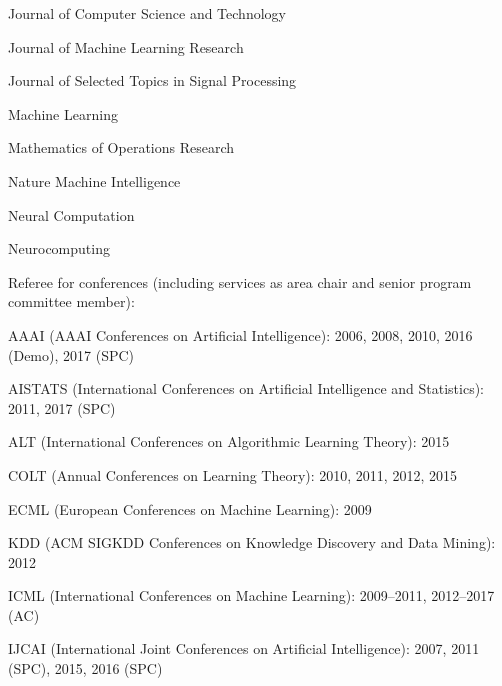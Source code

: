 \documentclass[10pt,twoside,letterpaper]{article}
\newcommand{\negitemspace}{\vspace{1mm}}
\begin{document}
\begin{compactitem}
\begin{compactitem}
\item{Journal of Computer Science and Technology}

\item{Journal of Machine Learning Research}

\item{Journal of Selected Topics in Signal Processing}

\item{Machine Learning}

\item{Mathematics of Operations Research}

\item{Nature Machine Intelligence}

\item{Neural Computation}

\item{Neurocomputing}

\end{compactitem} \negitemspace

\item{Referee for conferences (including services as area chair and senior program committee member):}

\begin{compactitem}

\item{AAAI (AAAI Conferences on Artificial Intelligence): 2006, 2008, 2010, 2016 (Demo), 2017 (SPC)}

\item{AISTATS (International Conferences on Artificial Intelligence and Statistics): 2011, 2017 (SPC)}

\item{ALT (International Conferences on Algorithmic Learning Theory): 2015}

\item{COLT (Annual Conferences on Learning Theory): 2010, 2011, 2012, 2015}

\item{ECML (European Conferences on Machine Learning): 2009}

\item{KDD (ACM SIGKDD Conferences on Knowledge Discovery and Data Mining): 2012}

\item{ICML (International Conferences on Machine Learning): 2009--2011, 2012--2017 (AC)}

\item{IJCAI (International Joint Conferences on Artificial Intelligence): 2007, 2011 (SPC), 2015, 2016 (SPC)}


\end{compactitem}
\end{compactitem}
\end{document}
